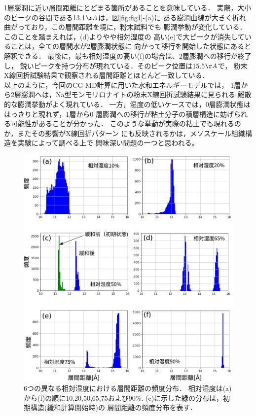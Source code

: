 1層膨潤に近い層間距離にとどまる箇所があることを意味している．
実際，大小のピークの谷間である13.1$\AA$は，図\ref{fig:fig1}-(a)に
ある膨潤曲線が大きく折れ曲がっており，この層間距離を境に，粉末試料でも
膨潤挙動が変化している．このことを踏まえれば，(d)よりやや相対湿度の
高い(e)で大ピークが消失していることは，全ての層間水が2層膨潤状態に
向かって移行を開始した状態にあると解釈できる．
最後に，最も相対湿度の高い(f)の場合は、2層膨潤への移行が終了し，
鋭いピークを持つ分布が現れている．そのピーク位置は15.5$\AA$で，
粉末X線回折試験結果で観察される層間距離とほとんど一致している．\\
\hspace{\parindent}
以上のように，今回のCG-MD計算に用いた水和エネルギーモデルでは，
1層から2層膨潤へは，Na型モンモリロナイトの粉末X線回折試験結果に見られる
離散的な膨潤挙動がよく現れている．
一方，湿度の低いケースでは，0層膨潤状態ははっきりと現れず，1層から0
層膨潤への移行が粘土分子の積層構造に妨げられる可能性があることが分かった．
このような挙動が実際の粘土でも現れるのか，またその影響がX線回折パターン
にも反映されるかは，メソスケール組織構造を実験によって調べる上で
興味深い問題の一つと思われる。
\begin{figure}[h]
	\begin{center}
	\includegraphics[width=1.0\linewidth]{Figs/fig5.pdf} 
	\end{center}
	\caption{
		6つの異なる相対湿度における層間距離の頻度分布．
		相対湿度は(a)から(f)の順に10,20,50,65,75および90$\%$. 
		(c)に示した緑の分布は，初期構造(緩和計算開始時)の
		層間距離の頻度分布を表す．
	} 
	\label{fig:fig5}
\end{figure}
